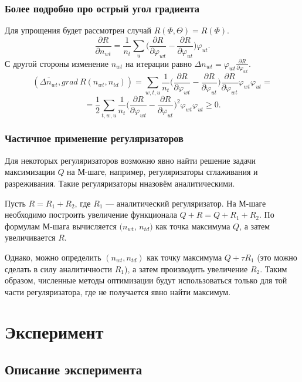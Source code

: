 \documentclass[utf8]{beamer}
\renewcommand{\geq}{\geqslant}
\renewcommand{\phi}{\varphi}
\begin{document}
\begin{frame}
\frametitle{Более подробно про острый угол градиента}

Для упрощения будет рассмотрен случай $R(\Phi, \Theta) = R(\Phi)$.
\[
\frac{\partial{R}}{\partial{n_{wt}}}  = \frac{1}{n_t} \sum_{u} \bigg(\frac{\partial{R}}{\partial{\phi_{wt}}}  -  \frac{\partial{R}}{\partial{\phi_{ut}}} \bigg)  \phi_{ut}.
\]
С другой стороны изменение $n_{wt}$ на итерации равно $ \Delta n_{wt} =  \phi_{wt} \frac{\partial{R}}{\partial{\phi_{wt}}}$.
\[
(\overline{\Delta n_{wt}}, grad\ R(n_{wt}, n_{td})) = \sum\limits_{w, t, u}  \frac{1}{n_{t}}  \bigg(  \frac{\partial{R}}{\partial{\phi_{wt}}}  -  \frac{\partial{R}}{\partial{\phi_{ut}}}  \bigg)  \frac{\partial{R}}{\partial{\phi_{wt}}} \phi_{wt} \phi_{ut}  = 
\]
\[
= \frac12  \sum\limits_{t, w, u}  \frac{1}{n_{t}} \bigg(  \frac{\partial{R}}{\partial{\phi_{wt}}}  -  \frac{\partial{R}}{\partial{\phi_{ut}}}  \bigg)^2 \phi_{wt} \phi_{ut}  \geq 0.
\]
\end{frame}

\begin{frame}
\frametitle{Частичное применение регуляризаторов}
Для некоторых регуляризаторов возможно явно найти решение  задачи  максимизации  $Q$ на М-шаге, например, регуляризаторы сглаживания и разреживания. Такие регуляризаторы нназовём аналитическими.
\medskip

Пусть $R = R_1 + R_2$, где $R_1$ --- аналитический регуляризатор. На М-шаге необходимо построить увеличение функционала $Q + R = Q + R_1 + R_2$. По формулам М-шага вычисляется $(n_{wt}$, $n_{td})$ как точка максимума $Q$, а затем увеличивается $R$.  
\medskip

Однако, можно определить $(n_{wt},n_{td})$ как точку максимума $Q + \tau R_1 $ (это можно сделать в силу аналитичности $R_1$), а затем производить увеличение $R_2$. Таким образом,  численные методы оптимизации будут использоваться только для той части регуляризатора, где не получается явно найти максимум.
\end{frame}

\section{Эксперимент}
\subsection{Описание эксперимента}
	
\end{document}

